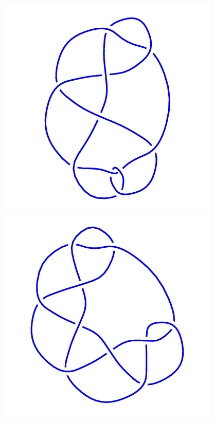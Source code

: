 \begin{figure}[H]
\begin{minipage}[b]{.18\linewidth}
	\end{minipage}
	\begin{minipage}[b]{.18\linewidth}
		\centering
		\includegraphics[width=\linewidth]{../data/10_44.png}
	\end{minipage}
	\begin{minipage}[b]{.18\linewidth}
		\centering
		\includegraphics[width=\linewidth]{../data/10_45.png}

\end{minipage}
\end{figure}
